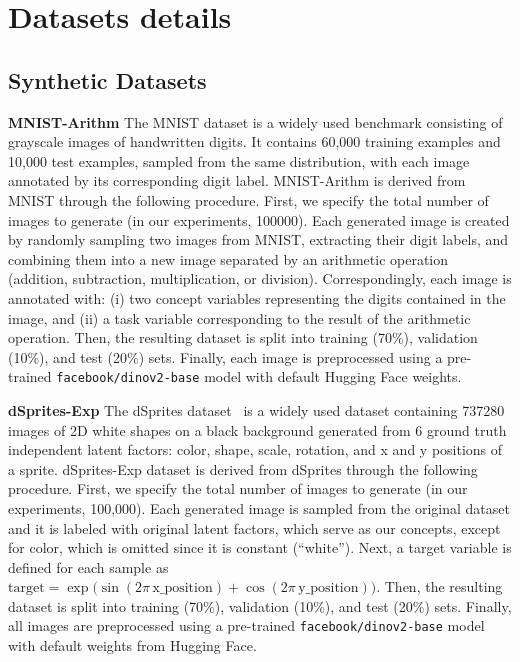 \documentclass{article}
\theoremstyle{plain}
\theoremstyle{definition}
\theoremstyle{remark}
\newcommand{\mypar}[1]{\noindent\textbf{#1}}
\begin{document}
\section{Datasets details}
\label{app:datasets}

\subsection{Synthetic Datasets}

\mypar{MNIST-Arithm} The MNIST dataset \citep{lecun2010} is a widely used benchmark consisting of grayscale images of handwritten digits. It contains 60,000 training examples and 10,000 test examples, sampled from the same distribution, with each image annotated by its corresponding digit label. MNIST-Arithm is derived from MNIST through the following procedure. First, we specify the total number of images to generate (in our experiments, 100000).  Each generated image is created by randomly sampling two images from MNIST, extracting their digit labels, and combining them into a new image separated by an arithmetic operation (addition, subtraction, multiplication, or division). Correspondingly, each image is annotated with: (i) two concept variables representing the digits contained in the image, and (ii) a task variable corresponding to the result of the arithmetic operation. Then, the resulting dataset is split into training (70\%), validation (10\%), and test (20\%) sets. Finally, each image is preprocessed using a pre-trained \texttt{facebook/dinov2-base} model with default Hugging Face weights.

\mypar{dSprites-Exp} The dSprites dataset~\citep{dsprites17} is a widely used dataset containing 737280 images of 2D white shapes on a black background generated from 6 ground truth independent latent factors: color, shape, scale, rotation, and x and y positions of a sprite. dSprites-Exp dataset is derived from dSprites through the following procedure. First, we specify the total number of images to generate (in our experiments, 100,000). Each generated image is sampled from the original dataset and it is labeled with original latent factors, which serve as our concepts, except for color, which is omitted since it is constant (``white''). 
Next, a target variable is defined for each sample as $\text{target} = \exp\Big(\sin(2 \pi \, \text{x\_position}) + \cos(2 \pi \, \text{y\_position})\Big)$. Then, the resulting dataset is split into training (70\%), validation (10\%), and test (20\%) sets. 
Finally, all images are preprocessed using a pre-trained \texttt{facebook/dinov2-base} model with default weights from Hugging Face.
\end{document}
